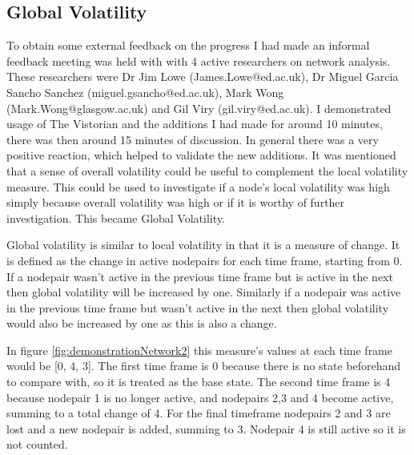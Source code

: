 \subsection{Global Volatility}

To obtain some external feedback on the progress I had made an informal feedback meeting was held with with 4 active researchers on network analysis. These researchers were Dr Jim Lowe (James.Lowe@ed.ac.uk), Dr Miguel Garcia Sancho Sanchez (miguel.gsancho@ed.ac.uk), Mark Wong (Mark.Wong@glasgow.ac.uk) and Gil Viry (gil.viry@ed.ac.uk). I demonstrated usage of The Vistorian and the additions I had made for around 10 minutes, there was then around 15 minutes of discussion. In general there was a very positive reaction, which helped to validate the new additions. It was mentioned that a sense of overall volatility could be useful to complement the local volatility measure. This could be used to investigate if a node's local volatility was high simply because overall volatility was high or if it is worthy of further investigation. This became Global Volatility.

Global volatility is similar to local volatility in that it is a measure of change. It is defined as the change in active nodepairs for each time frame, starting from 0. If a nodepair wasn't active in the previous time frame but is active in the next then global volatility will be increased by one. Similarly if a nodepair was active in the previous time frame but wasn't active in the next then global volatility would also be increased by one as this is also a change. 

In figure \ref{fig:demonstrationNetwork2} this measure's values at each time frame would be [0, 4, 3]. The first time frame is 0 because there is no state beforehand to compare with, so it is treated as the base state. The second time frame is 4 because nodepair 1 is no longer active, and nodepairs 2,3 and 4 become active, summing to a total change of 4. For the final timeframe nodepairs 2 and 3 are lost and a new nodepair is added, summing to 3. Nodepair 4 is still active so it is not counted.


